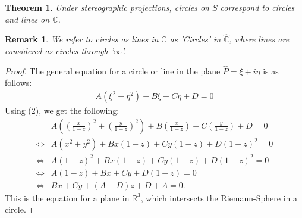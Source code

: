 \documentclass[12pt, a4paper]{article}
\theoremstyle{plain}
\newtheorem{thm}{Theorem} %
\newtheorem{rem}{Remark}
\theoremstyle{definition}
\begin{document}
			\begin{thm}
				Under stereographic projections, circles on $S$ correspond to circles and lines on $\mathbb{C}$.\\
			\end{thm}

			\begin{rem}
				We refer to circles as lines in $\mathbb{C}$ as 'Circles' in $\hat{\mathbb{C}}$, where lines are considered as circles through '$\infty$'.
			\end{rem}

			\begin{proof}
				The general equation for a circle or line in the plane $\hat{P} = \xi + i \eta$ is as follows:
				\begin{align*}
					A(\xi^2+\eta^2) + B \xi + C \eta + D = 0
				\end{align*}
				Using (2), we get the following:
				\begin{align*}
					&A\left(\left(\frac{x}{1-z}\right)^2+\left(\frac{y}{1-z}\right)^2\right) + 
					B\left(\frac{x}{1-z}\right) + C \left(\frac{y}{1-z}\right) + D = 0 \\ \iff
					&A(x^2+y^2) + Bx(1-z) + Cy(1-z) + D(1-z)^2 = 0 \\ \iff
					&A(1-z)^2 + Bx(1-z) + Cy(1-z) + D(1-z)^2 = 0\\ \iff
					&A(1-z) + Bx + Cy + D(1-z) = 0\\ \iff
					&Bx + Cy + (A-D)z + D+A = 0.
				\end{align*}
				This is the equation for a plane in $\mathbb{R}^3$, which intersects the Riemann-Sphere in a circle.
			\end{proof}
\end{document}
